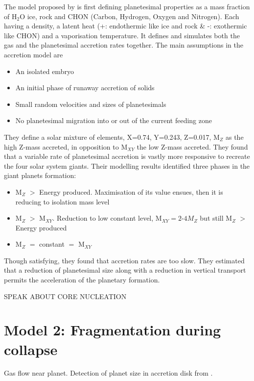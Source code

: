 \documentclass[12pt]{article} %
\begin{document}
\noindent The model proposed by \cite{pollack1996formation} is first defining planetesimal properties as a mass fraction of H$_2$O ice, rock and CHON (Carbon, Hydrogen, Oxygen and Nitrogen). Each having a density, a latent heat (+: endothermic like ice and rock \& -: exothermic like CHON) and a vaporisation temperature. It defines and simulates both the gas and the planetesimal accretion rates together. \newline\linebreak
The main assumptions in the accretion model are 
\begin{itemize}
\setlength\itemsep{0em}
\item An isolated embryo
\item An initial phase of runaway accretion of solids
\item Small random velocities and sizes of planetesimals
\item No planetesimal migration into or out of the current feeding zone
\end{itemize}

\noindent They define a solar mixture of elements, X=0.74, Y=0.243, Z=0.017, M$_Z$ as the high Z-mass accreted, in opposition to M$_{XY}$ the low Z-mass accreted. They found that a variable rate of planetesimal accretion \cite{lissauer1987timescales} is vastly more responsive to recreate the four solar system giants. Their modelling results identified three phases in the giant planets formation:

\begin{itemize}
\setlength\itemsep{0em}
\item M$_Z$ $>$ Energy produced. Maximisation of its value ensues, then it is reducing to isolation mass level
\item M$_Z$ $>$ M$_{XY}$. Reduction to low constant level, M$_{XY} = 2$-$4 M_Z$ but still M$_Z$ $>$ Energy produced
\item M$_Z$ $=$ constant $=$ M$_{XY}$
\end{itemize}

\noindent Though satisfying, they found that accretion rates are too slow. They estimated that a reduction of planetesimal size along with a reduction in vertical transport permits the acceleration of the planetary formation.\newline\linebreak

\noindent SPEAK ABOUT CORE NUCLEATION

\section{Model 2: Fragmentation during collapse}\vspace{-2ex}\titlerule[1pt]\bigskip
Gas flow near planet. 
Detection of planet size in accretion disk from \cite{bate2003three}.\newline
\end{document}
